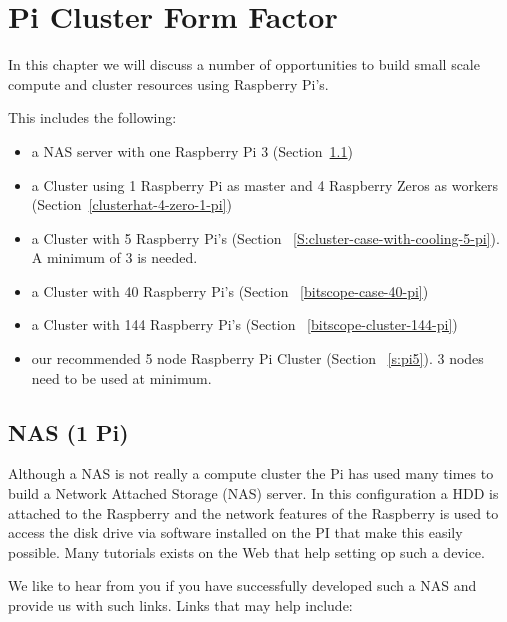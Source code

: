 
\chapter{Pi Cluster Form Factor}\label{c:pi-cluster-form-factor}


In this chapter we will discuss a number of opportunities to build
small scale compute and cluster resources using Raspberry Pi's.

This includes the following:

\begin{itemize}

\item a NAS server with one Raspberry Pi 3 (Section~\ref{nas-1-pi})

\item a Cluster using 1 Raspberry Pi as master and 4 Raspberry Zeros
  as workers (Section~\ref{clusterhat-4-zero-1-pi})

\item a Cluster with 5 Raspberry Pi's (Section
 ~\ref{S:cluster-case-with-cooling-5-pi}). A minimum of 3 is needed.

\item a Cluster with 40 Raspberry Pi's (Section
 ~\ref{bitscope-case-40-pi})

\item a Cluster with 144 Raspberry Pi's (Section
 ~\ref{bitscope-cluster-144-pi})

\item our recommended 5 node Raspberry Pi Cluster (Section
 ~\ref{s:pi5}). 3 nodes need to be used at minimum.
 

\end{itemize}

\section{NAS (1 Pi)}\label{nas-1-pi}

Although a NAS is not really a compute cluster the Pi has used many
times to build a Network Attached Storage (NAS) server. In this
configuration a HDD is attached to the Raspberry and the network
features of the Raspberry is used to access the disk drive via
software installed on the PI that make this easily possible. Many
tutorials exists on the Web that help setting op such a device.

We like to hear from you if you have successfully developed such a NAS
and provide us with such links. Links that may help include:

